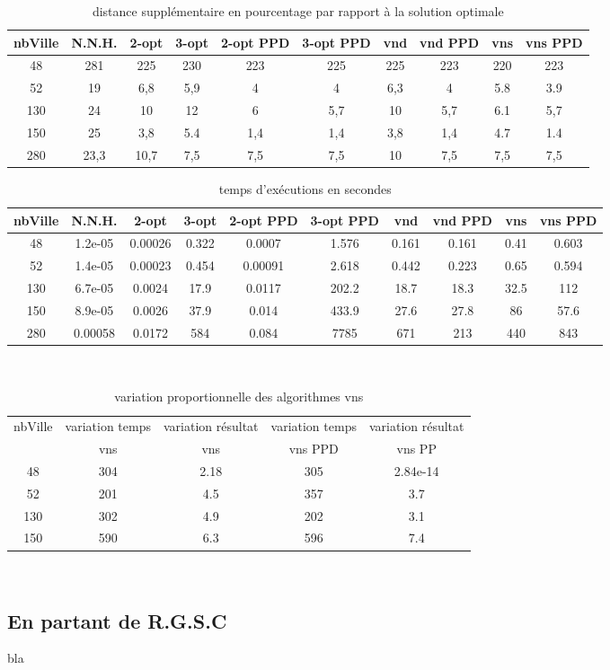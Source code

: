 \documentclass[12pt,a4paper]{article}
\begin{document}
\begin{table}[!h]
\centering
\begin{tabular}{|*{10}{c|}}
  \hline
  nbVille & N.N.H. & 2-opt & 3-opt & 2-opt PPD & 3-opt PPD & vnd & vnd PPD & vns & vns PPD \\
  \hline
  48 & 281 & 225 & 230 & 223 & 225 & 225 & 223 & 220 & 223 \\
  52 & 19 & 6,8 & 5,9 & 4 & 4 & 6,3 & 4 & 5.8 & 3.9 \\
  130 & 24 & 10 & 12 & 6 & 5,7 & 10 & 5,7 & 6.1 & 5,7 \\
  150 & 25 & 3,8 & 5.4 & 1,4 & 1,4 & 3,8 & 1,4 & 4.7 & 1.4 \\
  280 & 23,3 & 10,7 & 7,5 & 7,5 & 7,5 & 10 & 7,5 & 7,5 & 7,5 \\
  \hline
\end{tabular}
\caption{distance supplémentaire en pourcentage par rapport à la solution optimale}
\label{NNHpourcentageperf}
\end{table}

\begin{table}[!h]
\centering
\begin{tabular}{|*{10}{c|}}
  \hline
  nbVille & N.N.H. & 2-opt & 3-opt & 2-opt PPD & 3-opt PPD & vnd & vnd PPD & vns & vns PPD \\
  \hline
  48 & 1.2e-05 & 0.00026 & 0.322 & 0.0007 & 1.576 & 0.161 & 0.161 & 0.41 & 0.603 \\
  52 & 1.4e-05 & 0.00023 & 0.454 & 0.00091 & 2.618 & 0.442 & 0.223 & 0.65 & 0.594 \\
  130 & 6.7e-05 & 0.0024 & 17.9 & 0.0117 & 202.2 & 18.7 & 18.3 & 32.5 & 112 \\
  150 & 8.9e-05 & 0.0026 & 37.9 & 0.014 & 433.9 & 27.6 & 27.8 & 86 & 57.6 \\
  280 & 0.00058 & 0.0172 & 584 & 0.084 & 7785 & 671 & 213 & 440 & 843 \\ 
  \hline
\end{tabular}
\caption{temps d’exécutions en secondes}
\label{NNHtemps}
\end{table}
~\\
\begin{table}[!h]
\centering
\begin{tabular}{|*{5}{c|}}
  \hline
  nbVille & variation temps & variation résultat & variation temps & variation résultat \\
  ~ & vns & vns & vns PPD & vns PP \\
  \hline
  48 & 304 & 2.18 & 305 & 2.84e-14 \\ 
  52 & 201 & 4.5 & 357 & 3.7 \\
  130 & 302 & 4.9 & 202 & 3.1 \\
  150 & 590 & 6.3 & 596 & 7.4 \\
  \hline
\end{tabular}
\caption{variation proportionnelle des algorithmes vns}
\label{variationvnsNNH}
\end{table}
~\\
\subsection{En partant de R.G.S.C}
bla
\end{document}
